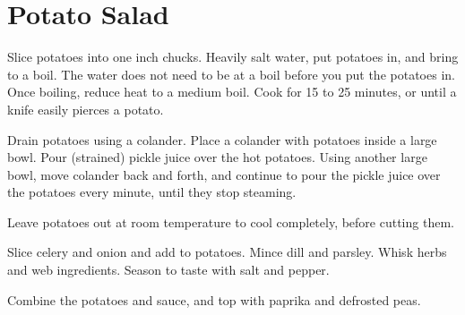 \section{Potato Salad}
\begin{recipe}



Slice potatoes into one inch chucks. 
Heavily salt water, put potatoes in, and bring to a boil. The water does not need to 
be at a boil before you put the potatoes in. Once boiling, reduce heat to a 
medium boil. Cook for 15 to 25 minutes, or until a knife easily pierces a potato. 

Drain potatoes using a colander. Place a colander with potatoes inside a large bowl. 
Pour (strained) pickle juice over the hot potatoes. Using another large bowl, move 
colander back and forth, and continue to pour the pickle juice over the potatoes every 
minute, until they stop steaming.

Leave potatoes out at room temperature to cool completely, before cutting them. 


Slice celery and onion and add to potatoes. Mince dill and parsley. 
Whisk herbs and web ingredients. Season to taste with salt and pepper.


Combine the potatoes and sauce, and top with paprika and defrosted peas.

\end{recipe}
